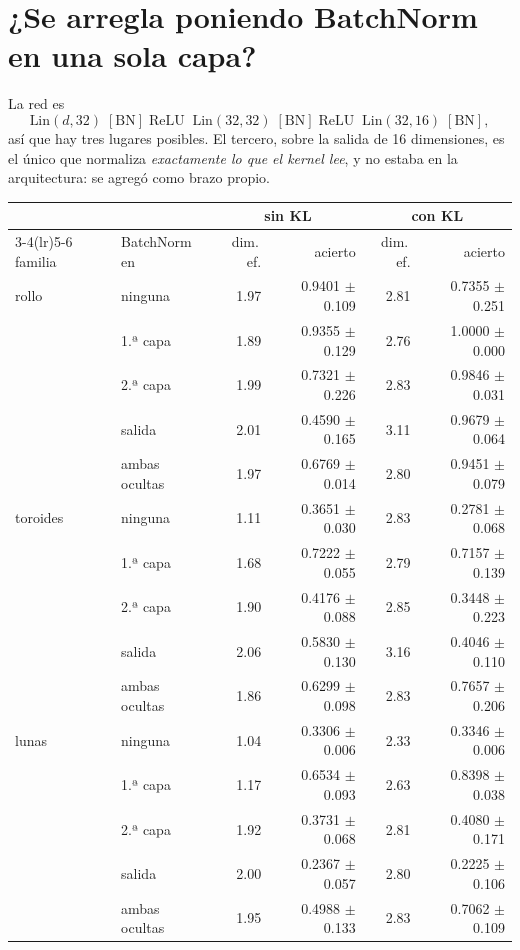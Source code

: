 \documentclass[11pt,a4paper]{article}
\begin{document}
\section{¿Se arregla poniendo BatchNorm en una sola capa?}

La red es
\[
\text{Lin}(d,32) \;[\text{BN}]\; \text{ReLU} \;\;
\text{Lin}(32,32) \;[\text{BN}]\; \text{ReLU} \;\;
\text{Lin}(32,16) \;[\text{BN}] ,
\]
así que hay tres lugares posibles. El tercero, sobre la salida de 16 dimensiones,
es el único que normaliza \emph{exactamente lo que el kernel lee}, y no estaba en
la arquitectura: se agregó como brazo propio.

\begin{center}
\begin{tabular}{llrrrr}
  \toprule
   & & \multicolumn{2}{c}{\textbf{sin KL}} & \multicolumn{2}{c}{\textbf{con KL}} \\
  \cmidrule(lr){3-4}\cmidrule(lr){5-6}
  familia & BatchNorm en & dim.\,ef. & acierto & dim.\,ef. & acierto \\
  \midrule
    rollo & ninguna & 1.97 & 0.9401 $\pm$ 0.109 & 2.81 & 0.7355 $\pm$ 0.251 \\
     & 1.ª capa & 1.89 & 0.9355 $\pm$ 0.129 & 2.76 & 1.0000 $\pm$ 0.000 \\
     & 2.ª capa & 1.99 & 0.7321 $\pm$ 0.226 & 2.83 & 0.9846 $\pm$ 0.031 \\
     & salida & 2.01 & 0.4590 $\pm$ 0.165 & 3.11 & 0.9679 $\pm$ 0.064 \\
     & ambas ocultas & 1.97 & 0.6769 $\pm$ 0.014 & 2.80 & 0.9451 $\pm$ 0.079 \\
    \midrule
    toroides & ninguna & 1.11 & 0.3651 $\pm$ 0.030 & 2.83 & 0.2781 $\pm$ 0.068 \\
     & 1.ª capa & 1.68 & 0.7222 $\pm$ 0.055 & 2.79 & 0.7157 $\pm$ 0.139 \\
     & 2.ª capa & 1.90 & 0.4176 $\pm$ 0.088 & 2.85 & 0.3448 $\pm$ 0.223 \\
     & salida & 2.06 & 0.5830 $\pm$ 0.130 & 3.16 & 0.4046 $\pm$ 0.110 \\
     & ambas ocultas & 1.86 & 0.6299 $\pm$ 0.098 & 2.83 & 0.7657 $\pm$ 0.206 \\
    \midrule
    lunas & ninguna & 1.04 & 0.3306 $\pm$ 0.006 & 2.33 & 0.3346 $\pm$ 0.006 \\
     & 1.ª capa & 1.17 & 0.6534 $\pm$ 0.093 & 2.63 & 0.8398 $\pm$ 0.038 \\
     & 2.ª capa & 1.92 & 0.3731 $\pm$ 0.068 & 2.81 & 0.4080 $\pm$ 0.171 \\
     & salida & 2.00 & 0.2367 $\pm$ 0.057 & 2.80 & 0.2225 $\pm$ 0.106 \\
     & ambas ocultas & 1.95 & 0.4988 $\pm$ 0.133 & 2.83 & 0.7062 $\pm$ 0.109 \\
  \bottomrule
\end{tabular}
\end{center}
\end{document}

